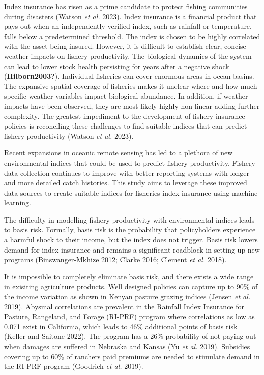 \documentclass[
  letterpaper,
  DIV=11,
  numbers=noendperiod]{scrartcl}
\begin{document}
Index insurance has risen as a prime candidate to protect fishing
communities during disasters (Watson \emph{et al.} 2023). Index
insurance is a financial product that pays out when an independently
verified index, such as rainfall or temperature, falls below a
predetermined threshold. The index is chosen to be highly correlated
with the asset being insured. However, it is difficult to establish
clear, concise weather impacts on fishery productivity. The biological
dynamics of the system can lead to lower stock health persisting for
years after a negative shock (\textbf{Hilborn2003?}). Individual
fisheries can cover enormous areas in ocean basins. The expansive
spatial coverage of fisheries makes it unclear where and how much
specific weather variables impact biological abundance. In addition, if
weather impacts have been observed, they are most likely highly
non-linear adding further complexity. The greatest impediment to the
development of fishery insurance policies is reconciling these
challenges to find suitable indices that can predict fishery
productivity (Watson \emph{et al.} 2023).

Recent expansions in oceanic remote sensing has led to a plethora of new
environmental indices that could be used to predict fishery
productivity. Fishery data collection continues to improve with better
reporting systems with longer and more detailed catch histories. This
study aims to leverage these improved data sources to create suitable
indices for fisheries index insurance using machine learning.

The difficulty in modelling fishery productivity with environmental
indices leads to basis risk. Formally, basis risk is the probability
that policyholders experience a harmful shock to their income, but the
index does not trigger. Basis risk lowers demand for index insurance and
remains a significant roadblock in setting up new programs
(Binswanger-Mkhize 2012; Clarke 2016; Clement \emph{et al.} 2018).

It is impossible to completely eliminate basis risk, and there exists a
wide range in exisiting agriculture products. Well designed policies can
capture up to 90\% of the income variation as shown in Kenyan pasture
grazing indices (Jensen \emph{et al.} 2019). Abysmal correlations are
prevalent in the Rainfall Index Insurance for Pasture, Rangeland, and
Forage (RI-PRF) program where correlations as low as 0.071 exist in
California, which leads to 46\% additional points of basis risk (Keller
and Saitone 2022). The program has a 26\% probability of not paying out
when damages are suffered in Nebraska and Kansas (Yu \emph{et al.}
2019). Subsidies covering up to 60\% of ranchers paid premiums are
needed to stimulate demand in the RI-PRF program (Goodrich \emph{et al.}
2019).
\end{document}

